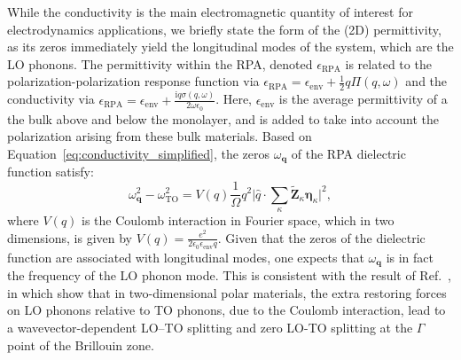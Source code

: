 \documentclass[aps,prb,twocolumn,
	           groupedaddress,superscriptaddress,
               amsfonts,amssymb,amsmath,floatfix,
	           citeautoscript]{revtex4-1}
\newcommand{\iu}{\mathrm{i}}
\begin{document}
While the conductivity is the main electromagnetic quantity of interest for electrodynamics applications, we briefly state the form of the (2D) permittivity, as its zeros immediately yield the longitudinal modes of the system, which are the LO phonons. The permittivity within the RPA, denoted $\epsilon_{\textrm{RPA}}$ is related to the polarization-polarization response function via \cite{jablan2009plasmonics} $\epsilon_{\textrm{RPA}} = \epsilon_{\mathrm{env}} + \frac{1}{2}q\Pi(q,\omega)$ and the conductivity via $\epsilon_{\textrm{RPA}} = \epsilon_{\mathrm{env}} + \frac{\iu q\sigma(q,\omega)}{2\omega\epsilon_0}$. Here, $\epsilon_{\mathrm{env}}$ is the average permittivity of a the bulk above and below the monolayer, and is added to take into account the polarization arising from these bulk materials. Based on Equation~\eqref{eq:conductivity_simplified}, the zeros $\omega_{\mathbf{q}}$ of the RPA dielectric function satisfy:
\begin{equation}
    \omega^2_{\mathbf{q}} - \omega^2_{\mathrm{TO}} = V(q)\frac{1}{\Omega}q^2\Big|\hat{q}\cdot\sum\limits_{\kappa}\tilde{\mathbf{Z}}_{\kappa}\boldsymbol{\eta}_{\kappa}\Big|^2,
    \label{eq:zerosofresponse}
\end{equation}
  where $V(q)$ is the Coulomb interaction in Fourier space, which in two dimensions, is given by $V(q) = \frac{e^2}{2\epsilon_0\epsilon_{\mathrm{env}}q}$. Given that the zeros of the dielectric function are associated with longitudinal modes, one expects that $\omega_{\mathbf{q}}$ is in fact the frequency of the LO phonon mode. This is consistent with the result of Ref.~, in which\relax{{}\ } \citeauthor{sohier2017breakdown} show that in two-dimensional polar materials, the extra restoring forces on LO phonons relative to TO phonons, due to the Coulomb interaction, lead to a wavevector-dependent LO--TO splitting and zero LO-TO splitting at the $\Gamma$ point of the Brillouin zone. 
  
\end{document}
